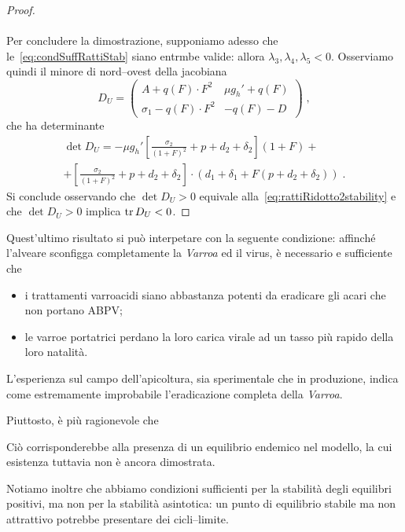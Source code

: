 \begin{proof}
\paragraph{}
Per concludere la dimostrazione, supponiamo adesso che le~\eqref{eq:condSuffRattiStab} siano entrmbe valide:
allora $\lambda_3, \lambda_4, \lambda_5 <0$. Osserviamo quindi il minore di nord--ovest della jacobiana
$$D_U =
\begin{pmatrix}
A + q(F) \cdot F^2 & \mu g_h' + q(F) \\
\sigma_1 - q(F) \cdot F^2 & -q(F) -D
\end{pmatrix} \; ,
$$
che ha determinante
\begin{multline*}
\det D_U = - \mu g_h' \left[ \frac{\sigma_2}{(1+F)^2} + p + d_2 +\delta_2 \right] (1+F) + \\
+ \left[ \frac{\sigma_2}{(1+F)^2} + p + d_2 +\delta_2 \right] \cdot \left( d_1 +\delta_1 + F(p+d_2+\delta_2) \right)
\; .
\end{multline*}
Si conclude osservando che $\det D_U > 0$ equivale alla~\eqref{eq:rattiRidotto2stability}
e che $\det D_U > 0$ implica $\operatorname{tr} D_U <0$.
\end{proof}

Quest'ultimo risultato si può interpetare con la seguente condizione: affinché l'alveare sconfigga completamente la \emph{Varroa} ed il virus, è necessario e sufficiente che
\begin{itemize}
    \item i trattamenti varroacidi siano abbastanza potenti da eradicare gli acari che non portano ABPV;
    \item le varroe portatrici perdano la loro carica virale ad un tasso più rapido della loro natalità.
\end{itemize}

L'esperienza sul campo dell'apicoltura, sia sperimentale che in produzione, indica come estremamente improbabile l'eradicazione completa della \emph{Varroa}.~\cite{privFPan}

Piuttosto, è più ragionevole che 

Ciò corrisponderebbe alla presenza di un equilibrio endemico nel modello, la cui esistenza tuttavia non è ancora dimostrata.

Notiamo inoltre che abbiamo condizioni sufficienti per la stabilità degli equilibri positivi, ma non per la stabilità asintotica: un punto di equilibrio stabile ma non attrattivo potrebbe presentare dei cicli--limite.

